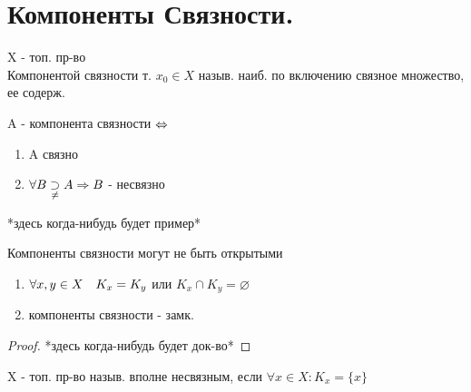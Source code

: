 \documentclass[geometry.tex]{subfiles}
\begin{document}
  \section{Компоненты Связности.}

  \begin{definition}
      X - топ. пр-во\\
      Компонентой связности т. $x_0 \in X$ назыв. наиб. по включению
      связное множество, ее содерж.\\
  \end{definition}

  \begin{definition}
      A - компонента связности $\Leftrightarrow$
      \begin{enumerate}
        \item A связно
        \item $\forall B \underset{\neq}{\supset} A \Rightarrow B$ - несвязно
      \end{enumerate}
  \end{definition}

  \begin{example}
      *здесь когда-нибудь будет пример*
  \end{example}

  \begin{consequence}
    Компоненты связности могут не быть открытыми
  \end{consequence}

  \begin{theorem}
      \begin{enumerate}
          \item $\forall x, y \in X \quad K_x = K_y$ или $K_x \cap K_y = \varnothing$
          \item компоненты связности - замк.
      \end{enumerate}
  \end{theorem}

  \begin{proof}
      *здесь когда-нибудь будет док-во*
  \end{proof}

  \begin{ddefinition}
      X - топ. пр-во назыв. вполне несвязным, если $\forall x \in X: K_x = \{x\}$
  \end{ddefinition}
\end{document}
